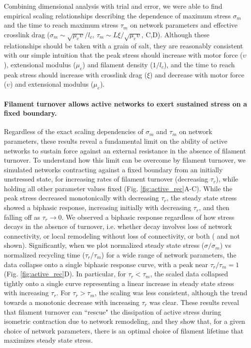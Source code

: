 \documentclass[10pt,letterpaper]{article}
\begin{document}
Combining dimensional analysis with trial and error, we were able to find empirical scaling relationships describing the dependence of maximum stress $\sigma_m$ and the time to reach maximum stress $\tau_m$ on network parameters and effective crosslink drag  ($\sigma_m \sim \sqrt{\mu_e\upsilon}/l_c$, $\tau_m\sim L\xi/\sqrt{\mu_e\upsilon}$, C,D). Although these relationships should be taken with a grain of salt, they are reasonably consistent with our simple intuition that the peak stress should increase with motor force ($\upsilon$), extensional modulus ($\mu_e$) and filament density ($1/l_c$), and the time to reach peak stress should increase with crosslink drag ($\xi$) and decrease with motor force ($\upsilon$) and extensional modulus ($\mu_e$).  

\paragraph{Filament turnover allows active networks to exert sustained stress on a fixed boundary.}

Regardless of the exact scaling dependencies of $\sigma_m$ and $\tau_m$ on network parameters, these results reveal a fundamental limit on the ability of active networks to sustain force against an external resistance in the absence of filament turnover.  To understand how this limit can be overcome by filament turnover, we simulated networks contracting against a fixed boundary from an initially unstressed state, for increasing rates of filament turnover (decreasing $\tau_r$), while holding all other parameter values fixed (Fig. \ref{fig:active_rec}A-C). While the peak stress decreased monotonically with decreasing $\tau_r$, the steady state stress showed a biphasic response, increasing initially with decreasing $\tau_r$, and then falling off as $\tau_r \to 0$.  We observed a biphasic response regardless of how stress decays in the absence of turnover, i.e. whether decay involves loss of network connectivity, or local remodeling without loss of connectivity, or both ( and not shown). Significantly, when we plot normalized steady state stress ($\sigma/\sigma_m$) vs normalized recycling time ($\tau_r$/$\tau_m$) for a wide range of network parameters, the data collapse onto a single biphasic response curve, with a peak near $\tau_r/\tau_m = 1$ (Fig. \ref{fig:active_rec}D). In particular, for $\tau_r < \tau_m$, the scaled data collapsed tightly onto a single curve representing a linear increase in steady state stress with increasing $\tau_r$. For $\tau_r > \tau_m$, the scaling was less consistent, although the trend towards a monotonic decrease with increasing $\tau_r$ was clear. These results reveal that filament turnover can ``rescue" the dissipation of active stress during isometric contraction due to network remodeling, and they show that, for a given choice of network parameters, there is an optimal choice of filament lifetime that maximizes steady state stress.
\end{document}
